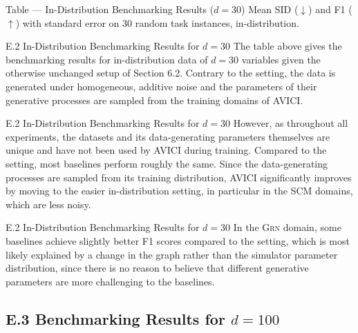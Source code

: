 \documentclass[aspectratio=169,10pt]{beamer}
\newcommand{\domain}[1]{\textsc{#1}}
\newcommand{\grndomain}{\domain{Grn}\xspace}
\newcommand{\ood}{\text{o.o.d.}\xspace}
\newcommand{\ours}{AVICI\xspace}
\begin{document}
\begin{frame}{Table --- In-Distribution Benchmarking Results ($d=30$)}
\vspace{0.2cm}
{\footnotesize Mean SID ($\downarrow$) and F1 ($\uparrow$) with standard error on \num{30} random task instances, in-distribution.}
\end{frame}

\begin{frame}{E.2 In-Distribution Benchmarking Results for $d=30$}
\small
The table above gives the benchmarking results for in-distribution data of $d=30$ variables given the otherwise unchanged setup of Section 6.2. Contrary to the \ood setting, the data is generated under homogeneous, additive noise and the parameters of their generative processes are sampled from the training domains of \ours.
\end{frame}

\begin{frame}{E.2 In-Distribution Benchmarking Results for $d=30$}
\small
However, as throughout all experiments, the datasets and its data-generating parameters themselves are unique and have not been used by \ours during training. Compared to the \ood setting, most baselines perform roughly the same. Since the data-generating processes are sampled from its training distribution, \ours significantly improves by moving to the easier in-distribution setting, in particular in the SCM domains, which are less noisy.
\end{frame}

\begin{frame}{E.2 In-Distribution Benchmarking Results for $d=30$}
\small
In the \grndomain domain, some baselines achieve slightly better F1 scores compared to the \ood setting, which is most likely explained by a change in the graph rather than the simulator parameter distribution, since there is no reason to believe that different generative parameters are more challenging to the baselines.
\end{frame}

\subsection{E.3 Benchmarking Results for $d=100$}
\end{document}
